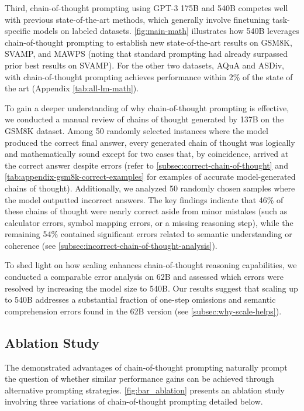 Third, chain-of-thought prompting using GPT-3 175B and \palm{} 540B competes well with previous state-of-the-art methods, which generally involve finetuning task-specific models on labeled datasets. \cref{fig:main-math} illustrates how \palm{} 540B leverages chain-of-thought prompting to establish new state-of-the-art results on GSM8K, SVAMP, and MAWPS (noting that standard prompting had already surpassed prior best results on SVAMP). For the other two datasets, AQuA and ASDiv, \palm{} with chain-of-thought prompting achieves performance within 2\% of the state of the art (Appendix \cref{tab:all-lm-math}).

To gain a deeper understanding of why chain-of-thought prompting is effective, we conducted a manual review of chains of thought generated by \lamda{} 137B on the GSM8K dataset. Among 50 randomly selected instances where the model produced the correct final answer, every generated chain of thought was logically and mathematically sound except for two cases that, by coincidence, arrived at the correct answer despite errors (refer to \cref{subsec:correct-chain-of-thought} and \cref{tab:appendix-gsm8k-correct-examples} for examples of accurate model-generated chains of thought). Additionally, we analyzed 50 randomly chosen samples where the model outputted incorrect answers. The key findings indicate that 46\% of these chains of thought were nearly correct aside from minor mistakes (such as calculator errors, symbol mapping errors, or a missing reasoning step), while the remaining 54\% contained significant errors related to semantic understanding or coherence (see \cref{subsec:incorrect-chain-of-thought-analysis}). 

To shed light on how scaling enhances chain-of-thought reasoning capabilities, we conducted a comparable error analysis on \palm{} 62B and assessed which errors were resolved by increasing the model size to \palm{} 540B. Our results suggest that scaling \palm{} up to 540B addresses a substantial fraction of one-step omissions and semantic comprehension errors found in the 62B version (see \cref{subsec:why-scale-helps}).

\subsection{Ablation Study}\label{subsec:math-ablation}

The demonstrated advantages of chain-of-thought prompting naturally prompt the question of whether similar performance gains can be achieved through alternative prompting strategies. \cref{fig:bar_ablation} presents an ablation study involving three variations of chain-of-thought prompting detailed below.

